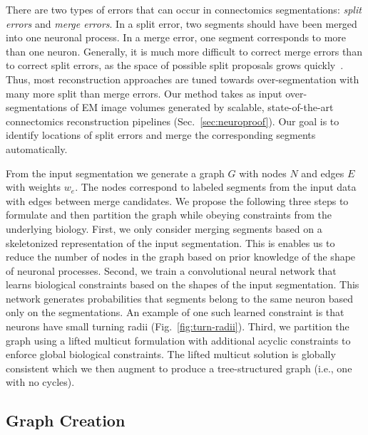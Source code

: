 There are two types of errors that can occur in connectomics segmentations: \textit{split errors} and \textit{merge errors}. 
In a split error, two segments should have been merged into one neuronal process. 
In a merge error, one segment corresponds to more than one neuron.
Generally, it is much more difficult to correct merge errors than to correct split errors,
as the space of possible split proposals grows quickly~\cite{parag2015properties}.
Thus, most reconstruction approaches are tuned towards over-segmentation with many more split than merge errors. 
Our method takes as input over-segmentations of EM image volumes generated by scalable, state-of-the-art connectomics reconstruction pipelines (Sec.~\ref{sec:neuroproof}). 
Our goal is to identify locations of split errors and merge the corresponding segments automatically.

From the input segmentation we generate a graph $G$ with nodes $N$ and edges $E$ with weights $w_e$. 
The nodes correspond to labeled segments from the input data with edges between merge candidates.
We propose the following three steps to formulate and then partition the graph while obeying constraints from the underlying biology.
First, we only consider merging segments based on a skeletonized representation of the input segmentation.
This is enables us to reduce the number of nodes in the graph based on prior knowledge of the shape of neuronal processes.
Second, we train a convolutional neural network that learns biological constraints based on the shapes of the input segmentation.
This network generates probabilities that segments belong to the same neuron based only on the segmentations. 
An example of one such learned constraint is that neurons have small turning radii (Fig.~\ref{fig:turn-radii}).
Third, we partition the graph using a lifted multicut formulation with additional acyclic constraints to enforce global biological constraints.
The lifted multicut solution is globally consistent which we then augment to produce a tree-structured graph (i.e., one with no cycles).

\subsection{Graph Creation}
\label{sec:skeletonization}

